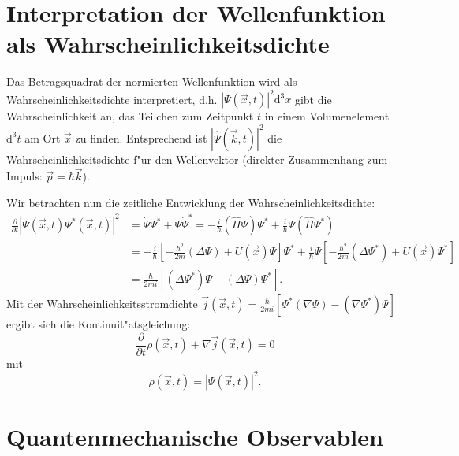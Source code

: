 \section{Interpretation der Wellenfunktion als Wahrscheinlichkeitsdichte}

Das Betragsquadrat der normierten Wellenfunktion wird als 
Wahrscheinlichkeitsdichte interpretiert, d.h. $|\Psi(\vec x,t)|^2\mathrm{d}^3x$
gibt die Wahrscheinlichkeit an, das Teilchen zum Zeitpunkt $t$ in einem
Volumenelement $\mathrm{d}^3 t$ am Ort $\vec x$ zu finden. 
Entsprechend ist $|\hat \Psi(\vec k,t)|^2$ die
Wahrscheinlichkeitsdichte f"ur den Wellenvektor (direkter Zusammenhang
zum Impuls: $\vec p = \hbar \vec k$).

Wir betrachten nun die zeitliche Entwicklung der Wahrscheinlichkeitsdichte:
\begin{equation}
\begin{split}
	\frac{\partial }{\partial  t} |\Psi(\vec x,t)\Psi^*(\vec x,t)|^2
	&= \dot \Psi \Psi^* + \Psi \dot \Psi^* =
	-\frac{i}{\hbar} (\hat H\Psi) \Psi^* + \frac{i}{\hbar} 
	\Psi(\hat H\Psi^*)\\
	&= - \frac{i}{\hbar} \left[-\frac{\hbar^2}{2m}(\Delta \Psi)
	+ U(\vec x) \Psi \right] \Psi^* + \frac{i}{\hbar} \Psi
	\left[-\frac{\hbar^2}{2m}(\Delta \Psi^*)+U(\vec x)\Psi^* \right]\\
	&=\frac{\hbar}{2mi} \left[(\Delta \Psi^*)\Psi - (\Delta \Psi)
	\Psi^* \right].
\end{split}
\end{equation}
Mit der Wahrscheinlichkeitsstromdichte $\vec j(\vec x,t) = \frac{\hbar}{2mi}
\left[\Psi^*(\nabla \Psi) - (\nabla \Psi^*)\Psi \right]$ ergibt
sich die Kontinuit"atsgleichung:
\begin{equation}
	\frac{\partial}{\partial t} \rho(\vec x,t) + \nabla \vec j(\vec x,t)=0
\end{equation}
mit
\begin{equation}
	\rho(\vec x,t) = |\Psi(\vec x,t)|^2.
\end{equation}

\section{Quantenmechanische Observablen}

